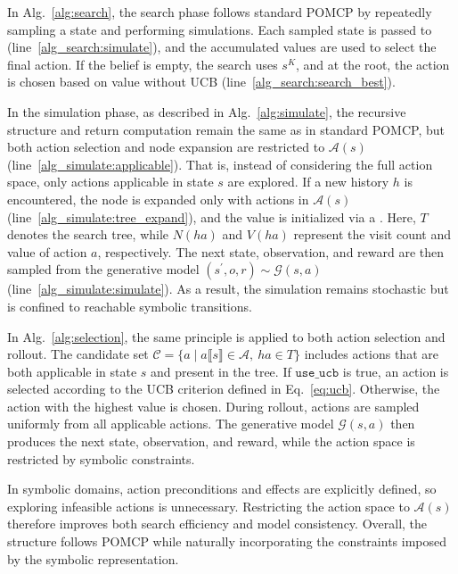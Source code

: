 In Alg.~\ref{alg:search}, the search phase follows standard POMCP by repeatedly sampling a state and performing simulations. Each sampled state is passed to \Simulate (line~\ref{alg_search:simulate}), and the accumulated values are used to select the final action. If the belief is empty, the search uses $s^{K}$, and at the root, the action is chosen based on value without UCB (line~\ref{alg_search:search_best}).


In the simulation phase, as described in Alg.~\ref{alg:simulate}, the recursive structure and return computation remain the same as in standard POMCP, but both action selection and node expansion are restricted to $\mathcal{A}(s)$ (line~\ref{alg_simulate:applicable}). That is, instead of considering the full action space, only actions applicable in state $s$ are explored. If a new history $h$ is encountered, the node is expanded only with actions in $\mathcal{A}(s)$ (line~\ref{alg_simulate:tree_expand}), and the value is initialized via a \Rollout. Here, $T$ denotes the search tree, while $N(ha)$ and $V(ha)$ represent the visit count and value of action $a$, respectively. The next state, observation, and reward are then sampled from the generative model $(s^\prime, o, r) \sim \mathcal{G}(s,a)$ (line~\ref{alg_simulate:simulate}). As a result, the simulation remains stochastic but is confined to reachable symbolic transitions.

In Alg.~\ref{alg:selection}, the same principle is applied to both action selection and rollout. The candidate set $\mathcal{C} = \{a \mid a\llbracket s \rrbracket \in \mathcal{A},\ ha \in T\}$ includes actions that are both applicable in state $s$ and present in the tree. If $\texttt{use\_ucb}$ is true, an action is selected according to the UCB criterion defined in Eq.~\ref{eq:ucb}. Otherwise, the action with the highest value is chosen. During rollout, actions are sampled uniformly from all applicable actions. The generative model $\mathcal{G}(s,a)$ then produces the next state, observation, and reward, while the action space is restricted by symbolic constraints.

In symbolic domains, action preconditions and effects are explicitly defined, so exploring infeasible actions is unnecessary. Restricting the action space to $\mathcal{A}(s)$ therefore improves both search efficiency and model consistency. Overall, the structure follows POMCP while naturally incorporating the constraints imposed by the symbolic representation.



